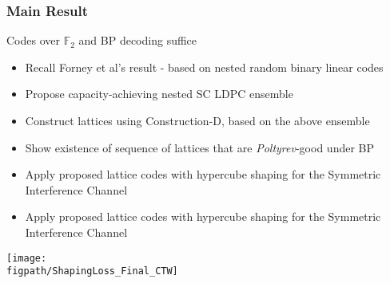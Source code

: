 \begin{frame}\frametitle{Main Result}
	\begin{block}{Codes over $\mathbb{F}_{2}$ and BP decoding suffice}
			\vspace{1em}
		\begin{itemize}
			\item Recall Forney et al's result - based on nested random binary linear codes
			\item Propose capacity-achieving nested SC LDPC ensemble
			\item Construct lattices using Construction-D, based on the above ensemble
			\item Show existence of sequence of lattices that are \textit{Poltyrev}-good under BP 
		\end{itemize}			
	\end{block}
\pause
\vspace{2em}
   \begin{itemize}
	        \item Apply proposed lattice codes with hypercube shaping for the {\blue Symmetric Interference Channel}
    \end{itemize}
\end{frame}

\begin{frame}
   \begin{itemize}
	        \item Apply proposed lattice codes with hypercube shaping for the {\blue Symmetric Interference Channel}
    \end{itemize}
    \centering
   \texttt{[image: \\figpath/ShapingLoss\_Final\_CTW]}
\end{frame}

%
